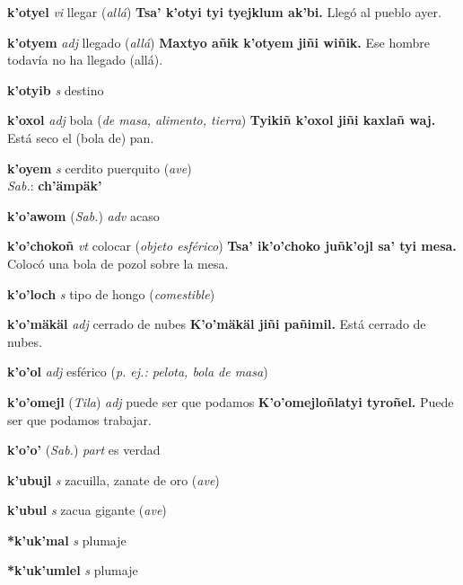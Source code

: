 \documentclass[10pt]{scrbook}
\newcommand{\entry}[1]{\textbf{#1}}
\newcommand{\partofspeech}[1]{\textit{#1}}
\newcommand{\spanishtranslation}[1]{#1}
\newcommand{\clarification}[1]{(\textit{#1})}
\newcommand{\cholexample}[1]{\textbf{#1}}
\newcommand{\exampletranslation}[1]{#1}
\newcommand{\dialectvariant}[1]{\\\textit{#1}:}
\newcommand{\dialectword}[1]{\textbf{#1}}
\newcommand{\relevantdialect}[1]{(\textit{#1})}
\begin{document}
\begin{multicols}{2}
\entry{k'otyel}
\partofspeech{vi}
\spanishtranslation{llegar}
\clarification{allá}
\cholexample{Tsa' k'otyi tyi tyejklum ak'bi.}
\exampletranslation{Llegó al pueblo ayer.}

\entry{k'otyem}
\partofspeech{adj}
\spanishtranslation{llegado}
\clarification{allá}
\cholexample{Maxtyo añik k'otyem jiñi wiñik.}
\exampletranslation{Ese hombre todavía no ha llegado (allá).}

\entry{k'otyib}
\partofspeech{s}
\spanishtranslation{destino}

\entry{k'oxol}
\partofspeech{adj}
\spanishtranslation{bola}
\clarification{de masa, alimento, tierra}
\cholexample{Tyikiñ k'oxol jiñi kaxlañ waj.}
\exampletranslation{Está seco el (bola de) pan.}

\entry{k'oyem}
\partofspeech{s}
\spanishtranslation{cerdito}
\spanishtranslation{puerquito}
\clarification{ave}
\dialectvariant{Sab.}
\dialectword{ch'ämpäk'}

\entry{k'o'awom}
\relevantdialect{Sab.}
\partofspeech{adv}
\spanishtranslation{acaso}

\entry{k'o'chokoñ}
\partofspeech{vt}
\spanishtranslation{colocar}
\clarification{objeto esférico}
\cholexample{Tsa' ik'o'choko juñk'ojl sa' tyi mesa.}
\exampletranslation{Colocó una bola de pozol sobre la mesa.}

\entry{k'o'loch}
\partofspeech{s}
\spanishtranslation{tipo de hongo}
\clarification{comestible}

\entry{k'o'mäkäl}
\partofspeech{adj}
\spanishtranslation{cerrado de nubes}
\cholexample{K'o'mäkäl jiñi pañimil.}
\exampletranslation{Está cerrado de nubes.}

\entry{k'o'ol}
\partofspeech{adj}
\spanishtranslation{esférico}
\clarification{p. ej.: pelota, bola de masa}

\entry{k'o'omejl}
\relevantdialect{Tila}
\partofspeech{adj}
\spanishtranslation{puede ser que podamos}
\cholexample{K'o'omejloñlatyi tyroñel.}
\exampletranslation{Puede ser que podamos trabajar.}

\entry{k'o'o'}
\relevantdialect{Sab.}
\partofspeech{part}
\spanishtranslation{es verdad}

\entry{k'ubujl}
\partofspeech{s}
\spanishtranslation{zacuilla, zanate de oro}
\clarification{ave}

\entry{k'ubul}
\partofspeech{s}
\spanishtranslation{zacua gigante}
\clarification{ave}

\entry{*k'uk'mal}
\partofspeech{s}
\spanishtranslation{plumaje}

\entry{*k'uk'umlel}
\partofspeech{s}
\spanishtranslation{plumaje}


\end{multicols}
\end{document}
